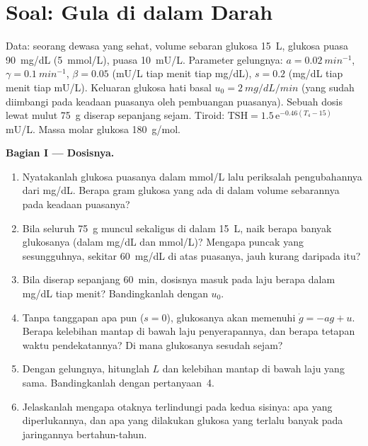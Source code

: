 \section{Soal: Gula di dalam Darah}

\begin{problem}
\label{pb:b3:endocrinology:1}
Data: seorang dewasa yang sehat, volume sebaran glukosa \qty{15}{L},
glukosa puasa \qty{90}{mg/dL} (\qty{5}{mmol/L}),  puasa
\qty{10}{mU/L}. Parameter gelungnya: $a = \qty{0.02}{min^{-1}}$, $\gamma =
\qty{0.1}{min^{-1}}$, $\beta = 0.05$ (mU/L tiap menit tiap mg/dL), $s = 0.2$
(mg/dL tiap menit tiap mU/L). Keluaran glukosa hati basal $u_{0} =
\qty{2}{mg/dL/min}$ (yang sudah diimbangi pada keadaan puasanya oleh
pembuangan puasanya). Sebuah dosis lewat mulut \qty{75}{g} diserap sepanjang
sejam. Tiroid: $\text{TSH} = 1.5\,\mathrm{e}^{-0.46(T_{4} - 15)}$ mU/L.
Massa molar glukosa \qty{180}{g/mol}.

\medskip
\noindent\textbf{Bagian I --- Dosisnya.}
\begin{enumerate}
  \item Nyatakanlah glukosa puasanya dalam mmol/L lalu periksalah pengubahannya
        dari mg/dL. Berapa gram glukosa yang ada di dalam volume sebarannya
        pada keadaan puasanya?
  \item Bila seluruh \qty{75}{g} muncul sekaligus di dalam \qty{15}{L}, naik berapa
        banyak glukosanya (dalam mg/dL dan mmol/L)? Mengapa puncak yang
        sesungguhnya, sekitar \qty{60}{mg/dL} di atas puasanya, jauh kurang daripada itu?
  \item Bila diserap sepanjang \qty{60}{min}, dosisnya masuk pada laju berapa dalam
        mg/dL tiap menit? Bandingkanlah dengan $u_{0}$.
  \item Tanpa tanggapan  apa pun ($s = 0$), glukosanya akan memenuhi $\dot
        g = -a g + u$. Berapa kelebihan mantap di bawah laju penyerapannya, dan berapa
        tetapan waktu pendekatannya? Di mana glukosanya sesudah
        sejam?
  \item Dengan gelungnya, hitunglah $L$ dan kelebihan mantap di bawah laju yang sama.
        Bandingkanlah dengan pertanyaan~4.
  \item Jelaskanlah mengapa otaknya terlindungi pada kedua sisinya: apa yang diperlukannya,
        dan apa yang dilakukan glukosa yang terlalu banyak pada jaringannya bertahun-tahun.
\end{enumerate}


\end{problem}
